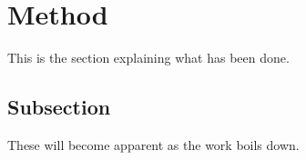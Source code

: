 
\section{Method}
This is the section explaining what has been done.

\subsection{Subsection}
These will become apparent as the work boils down. 

